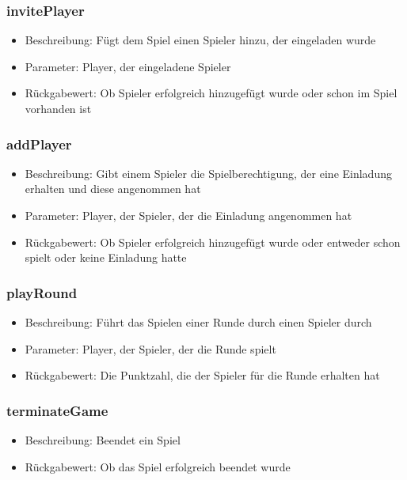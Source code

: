 \documentclass[a4paper]{scrreprt}
\begin{document}
   \subsubsection{invitePlayer}
   \begin{itemize}
           \item Beschreibung: Fügt dem Spiel einen Spieler hinzu, der eingeladen wurde
           \item Parameter: Player, der eingeladene Spieler
           \item Rückgabewert: Ob Spieler erfolgreich hinzugefügt wurde oder schon im Spiel vorhanden ist
   \end{itemize}
   \subsubsection{addPlayer}
   \begin{itemize}
              \item Beschreibung: Gibt einem Spieler die Spielberechtigung, der eine Einladung erhalten und diese angenommen hat
              \item Parameter: Player, der Spieler, der die Einladung angenommen hat
              \item Rückgabewert: Ob Spieler erfolgreich hinzugefügt wurde oder entweder schon spielt oder keine Einladung hatte
   \end{itemize}
   \subsubsection{playRound}
   \begin{itemize}
              \item Beschreibung: Führt das Spielen einer Runde durch einen Spieler durch
              \item Parameter: Player, der Spieler, der die Runde spielt
              \item Rückgabewert: Die Punktzahl, die der Spieler für die Runde erhalten hat
   \end{itemize}
   \subsubsection{terminateGame}
   \begin{itemize}
           \item Beschreibung: Beendet ein Spiel
           \item Rückgabewert: Ob das Spiel erfolgreich beendet wurde
   \end{itemize}
\end{document}
